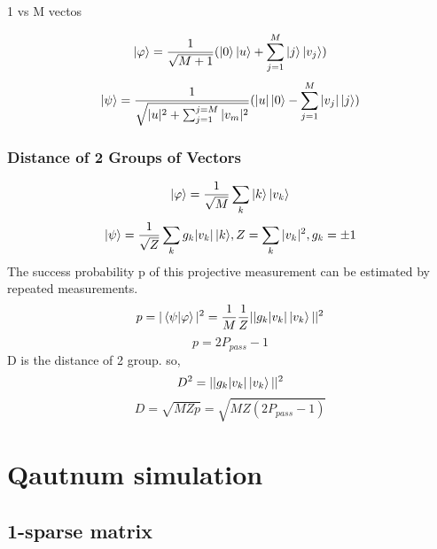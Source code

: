 \documentclass{article}
\begin{document}
1 vs M vectos


\[  \ket{\varphi}=\frac{1}{{\sqrt{M+1}}}(\ket{0}\ket{u}+\sum_{j=1}^{M}\ket{j}\ket{v_j})
\]
\[  \ket{\psi}=\frac{1}{\sqrt{|u|^{2}+\sum_{j=1}^{j=M}|v_m|^{2}}}(|u|\ket{0}-\sum_{j=1}^{M}|v_j|\ket{j})
\]

\subsubsection{ Distance of 2 Groups of Vectors}

\[  \ket{\varphi}= \frac{1}{ \sqrt{M} }  \sum_k{ \ket{k}\ket{v_k} } 
\]
$$  \ket{\psi}=\frac{1}{ \sqrt{Z} }  \sum_k{ g_k  |v_k| \ket{k} } 
,  Z=  \sum_k{  |v_k|^2  }, g_k=\pm1 
$$
The success probability p of this projective measurement
can be estimated by repeated measurements.
$$  p=|\braket{\psi|\varphi}|^{2}   = \frac{1}{ M }  \frac{1}{Z} ||g_k  |v_k| \ket{v_k}  ||^{2}  $$
$$ p = 2P_{pass}-1 $$
D is the distance of 2 group. so,\\
$$ D^{2}=||g_k  |v_k| \ket{v_k}  ||^{2} $$
$$ D=\sqrt{ M Z p }  = \sqrt{ M Z (2P_{pass}-1)}  $$

\section{Qautnum simulation}
\subsection{1-sparse matrix}
\end{document}
